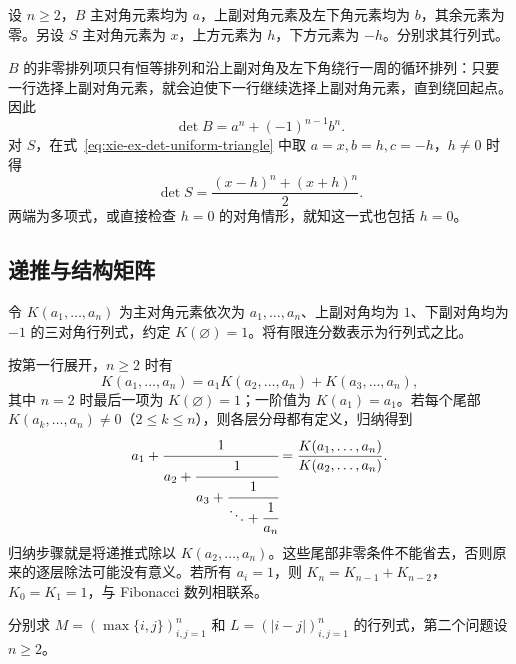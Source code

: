 \begin{example}
\label{ex:xie-ex-det-cyclic-bidiagonal}
设 $n\geq2$，$B$ 主对角元素均为 $a$，上副对角元素及左下角元素均为 $b$，其余元素为零。另设 $S$ 主对角元素为 $x$，上方元素为 $h$，下方元素为 $-h$。分别求其行列式。
\end{example}

\begin{solve}
$B$ 的非零排列项只有恒等排列和沿上副对角及左下角绕行一周的循环排列：只要一行选择上副对角元素，就会迫使下一行继续选择上副对角元素，直到绕回起点。因此
\[
\det B=a^n+(-1)^{n-1}b^n.
\]
对 $S$，在式~\eqref{eq:xie-ex-det-uniform-triangle} 中取 $a=x,b=h,c=-h$，$h\ne0$ 时得
\[
\det S=\frac{(x-h)^n+(x+h)^n}{2}.
\]
两端为多项式，或直接检查 $h=0$ 的对角情形，就知这一式也包括 $h=0$。
\end{solve}

\subsection{递推与结构矩阵}

\begin{example}
\label{ex:xie-ex-det-continued-fraction}
令 $K(a_1,\ldots,a_n)$ 为主对角元素依次为 $a_1,\ldots,a_n$、上副对角均为 $1$、下副对角均为 $-1$ 的三对角行列式，约定 $K(\varnothing)=1$。将有限连分数表示为行列式之比。
\end{example}

\begin{solve}
按第一行展开，$n\geq2$ 时有
\[
K(a_1,\ldots,a_n)
=a_1K(a_2,\ldots,a_n)+K(a_3,\ldots,a_n),
\]
其中 $n=2$ 时最后一项为 $K(\varnothing)=1$；一阶值为 $K(a_1)=a_1$。若每个尾部 $K(a_k,\ldots,a_n)\ne0$（$2\leq k\leq n$），则各层分母都有定义，归纳得到
\begin{equation}
\label{eq:xie-ex-det-continued-fraction}
a_1+\cfrac1{a_2+\cfrac1{a_3+\cfrac1{\ddots+\cfrac1{a_n}}}}
=\frac{K(a_1,\ldots,a_n)}{K(a_2,\ldots,a_n)}.
\end{equation}
归纳步骤就是将递推式除以 $K(a_2,\ldots,a_n)$。这些尾部非零条件不能省去，否则原来的逐层除法可能没有意义。若所有 $a_i=1$，则 $K_n=K_{n-1}+K_{n-2}$，$K_0=K_1=1$，与 Fibonacci 数列相联系。
\end{solve}

\begin{example}
\label{ex:xie-ex-det-max-distance}
分别求 $M=(\max\{i,j\})_{i,j=1}^{n}$ 和 $L=(|i-j|)_{i,j=1}^{n}$ 的行列式，第二个问题设 $n\geq2$。
\end{example}

